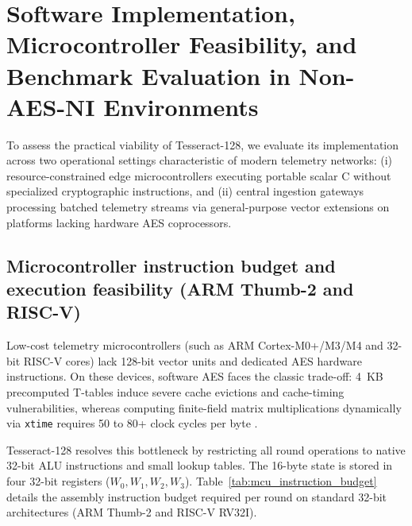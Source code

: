 \documentclass[10pt,twocolumn]{article}
\begin{document}
\section{Software Implementation, Microcontroller Feasibility, and Benchmark Evaluation in Non-AES-NI Environments}
\label{sec:software_benchmarks}
\label{sec:aead_simd}

To assess the practical viability of Tesseract-128, we evaluate its implementation across two operational settings characteristic of modern telemetry networks: (i) resource-constrained edge microcontrollers executing portable scalar C without specialized cryptographic instructions, and (ii) central ingestion gateways processing batched telemetry streams via general-purpose vector extensions on platforms lacking hardware AES coprocessors.

\subsection{Microcontroller instruction budget and execution feasibility (ARM Thumb-2 and RISC-V)}
\label{subsec:mcu_feasibility}

Low-cost telemetry microcontrollers (such as ARM Cortex-M0+/M3/M4 and 32-bit RISC-V cores) lack 128-bit vector units and dedicated AES hardware instructions. On these devices, software AES faces the classic trade-off: 4~KB precomputed T-tables induce severe cache evictions and cache-timing vulnerabilities, whereas computing finite-field matrix multiplications dynamically via \texttt{xtime} requires 50 to 80+ clock cycles per byte \cite{kaartinen2009comparative}.

Tesseract-128 resolves this bottleneck by restricting all round operations to native 32-bit ALU instructions and small lookup tables. The 16-byte state is stored in four 32-bit registers ($W_0, W_1, W_2, W_3$). Table~\ref{tab:mcu_instruction_budget} details the assembly instruction budget required per round on standard 32-bit architectures (ARM Thumb-2 and RISC-V RV32I).
\end{document}
